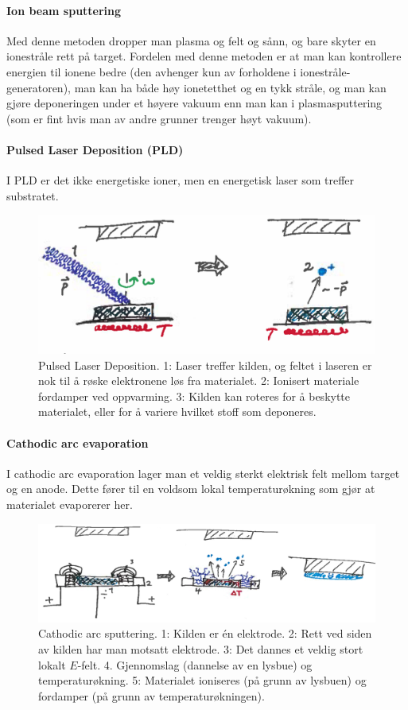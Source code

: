 \paragraph{Ion beam sputtering} Med denne metoden dropper man plasma og felt og sånn, og bare skyter en ionestråle rett på target. Fordelen med denne metoden er at man kan kontrollere energien til ionene bedre (den avhenger kun av forholdene i ionestråle-generatoren), man kan ha både høy ionetetthet og en tykk stråle, og man kan gjøre deponeringen under et høyere vakuum enn man kan i plasmasputtering (som er fint hvis man av andre grunner trenger høyt vakuum).

\paragraph{Pulsed Laser Deposition (PLD)} I PLD er det ikke energetiske ioner, men en energetisk laser som treffer substratet.
\begin{figure}[H]
\bmd\centering
\includegraphics[width=\linewidth]{metodefigs/pld.png}
\caption{Pulsed Laser Deposition. 1: Laser treffer kilden, og feltet i laseren er nok til å røske elektronene løs fra materialet. 2: Ionisert materiale fordamper ved oppvarming. 3: Kilden kan roteres for å beskytte materialet, eller for å variere hvilket stoff som deponeres.}
\emd\end{figure}

\paragraph{Cathodic arc evaporation} I cathodic arc evaporation lager man et veldig sterkt elektrisk felt mellom target og en anode. Dette fører til en voldsom lokal temperaturøkning som gjør at materialet evaporerer her.
\begin{figure}[H]
\bmd\centering
\includegraphics[width=\linewidth]{metodefigs/arcdep.png}
\caption{Cathodic arc sputtering. 1: Kilden er én elektrode. 2: Rett ved siden av kilden har man motsatt elektrode. 3: Det dannes et veldig stort lokalt $E$-felt. 4. Gjennomslag (dannelse av en lysbue) og temperaturøkning. 5: Materialet ioniseres (på grunn av lysbuen) og fordamper (på grunn av temperaturøkningen).}
\emd\end{figure}